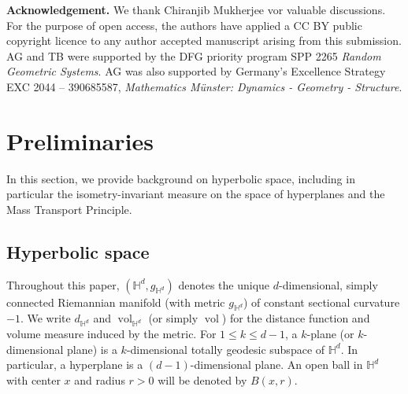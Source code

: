 \documentclass[12pt,a4paper]{article}
\theoremstyle{definition}
\renewcommand{\H}{\mathbb{H}}
\DeclareMathOperator{\vol}{vol}
\begin{document}
\medskip

{\bf\noindent Acknowledgement.} We thank Chiranjib Mukherjee vor valuable discussions. For the purpose of open access, the authors have applied a CC BY public copyright licence to any author accepted manuscript arising from this submission. AG and TB were supported by the DFG priority program SPP 2265 \textit{Random Geometric Systems}.
AG was also supported by Germany's Excellence Strategy  EXC 2044 -- 390685587, \textit{Mathematics M\"unster: Dynamics - Geometry - Structure}.




\section{Preliminaries} \label{sec:preliminaries}

In this section, we provide background on hyperbolic space, including in particular the isometry-invariant measure on the space of hyperplanes and the Mass Transport Principle.

\subsection{Hyperbolic space}

Throughout this paper, $(\H^d,g_{\H^d})$ denotes the unique $d$-dimensional, simply connected Riemannian manifold (with metric $g_{\H^d}$) of constant sectional curvature $-1$.
We write $d_{\H^d}$ and $\vol_{\H^d}$ (or simply $\vol$) for the distance function and volume measure induced by the metric.
For $1\leq k\leq d-1$, a $k$-plane (or $k$-dimensional plane) is a $k$-dimensional totally geodesic subspace of $\H^d$.
In particular, a hyperplane is a $(d-1)$-dimensional plane.
An open ball in $\mathbb{H}^d$ with center $x$ and radius $r>0$ will be denoted by $B(x,r)$.
\end{document}

